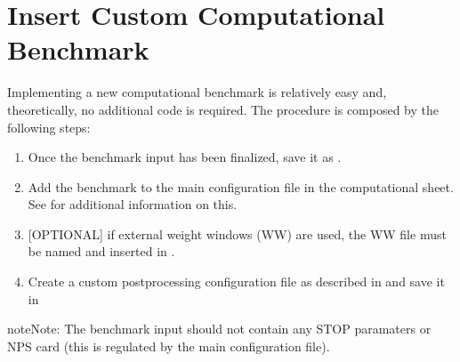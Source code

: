 \documentclass[letterpaper,10pt,english]{sphinxmanual}
\begin{document}
\section{Insert Custom Computational Benchmark}
\label{\detokenize{dev/insertbenchmarks:insert-custom-computational-benchmark}}\label{\detokenize{dev/insertbenchmarks:customcompbench}}
\sphinxAtStartPar
Implementing a new computational benchmark is relatively easy and, theoretically, no additional
code is required. The procedure is composed by the following steps:
\begin{enumerate}
%
\item {} 
\sphinxAtStartPar
Once the benchmark input has been finalized, save it as .

\item {} 
\sphinxAtStartPar
Add the benchmark to the main configuration file in the computational sheet. See {\hyperref[\detokenize{usage/configuration:compsheet}]{}}
for additional information on this.

\item {} 
\sphinxAtStartPar
{[}OPTIONAL{]} if external weight windows (WW) are used, the WW file must be named  and inserted in
.

\item {} 
\sphinxAtStartPar
Create a custom post\sphinxhyphen{}processing configuration file as described in {\hyperref[\detokenize{usage/configuration:ppconf}]{}} and save it in

\end{enumerate}

\begin{sphinxadmonition}{note}{Note:}
\sphinxAtStartPar
The benchmark input should not contain any STOP paramaters or NPS card (this is regulated by the
main configuration file).
\end{sphinxadmonition}
\end{document}
